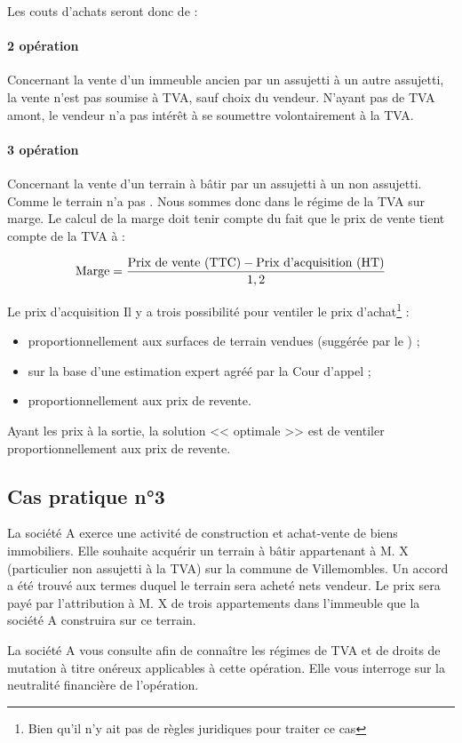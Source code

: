 		Les couts d'achats seront donc de :

		\paragraph{2\ieme{} opération} Concernant la vente d'un immeuble ancien par un assujetti à un autre assujetti, la vente n'est pas soumise à TVA, sauf choix du vendeur. N'ayant pas de TVA amont, le vendeur n'a pas intérêt à se soumettre volontairement à la TVA.

		\paragraph{3\ieme{} opération} Concernant la vente d'un terrain à bâtir par un assujetti à un non assujetti. Comme le terrain n'a pas . Nous sommes donc dans le régime de la TVA sur marge. Le calcul de la marge doit tenir compte du fait que le prix de vente tient compte de la TVA à  :

		\[ \textmd{Marge} = \frac{\textmd{Prix de vente (TTC)} -\textmd{Prix d'acquisition (HT)} }{1,2} \]

		\medskip Le prix d'acquisition Il y a trois possibilité pour ventiler le prix d'achat\footnote{Bien qu'il n'y ait pas de règles juridiques pour traiter ce cas} :
		\begin{itemize}
			\item proportionnellement aux surfaces de terrain vendues (suggérée par le \bofip) ;
			\item sur la base d'une estimation expert agréé par la Cour d'appel ;
			\item proportionnellement aux prix de revente.
		\end{itemize}
		Ayant les prix à la sortie, la solution << optimale >> est de ventiler proportionnellement aux prix de revente.


	\subsection*{Cas pratique n°3}

		\begin{enonce}
			La société A exerce une activité de construction et achat-vente de biens immobiliers. Elle souhaite acquérir un terrain à bâtir appartenant à M. X (particulier non assujetti à la TVA) sur la commune de Villemombles. Un accord a été trouvé aux termes duquel le terrain sera acheté  nets vendeur. Le prix sera payé par l’attribution à M. X de trois appartements dans l’immeuble que la société A construira sur ce terrain.


			La société A vous consulte afin de connaître les régimes de TVA et de droits de mutation à titre onéreux applicables à cette opération. Elle vous interroge sur la neutralité financière de l’opération.

		\end{enonce}

